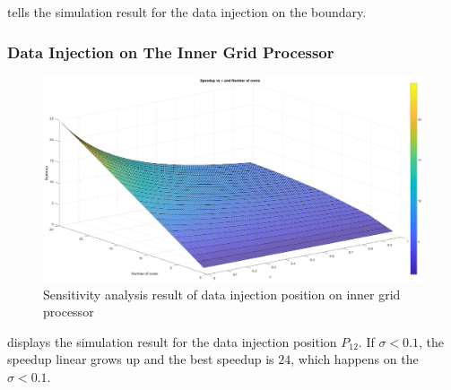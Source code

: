  tells the simulation result for the data injection on the boundary.  

\newpage 
\subsubsection{Data Injection on The Inner Grid Processor}
\begin{figure}[!ht]
\centering
\includegraphics[width=1\columnwidth]{figure/sa5t5i_no.eps}
\caption{Sensitivity analysis result of data injection position on inner grid processor}
\label{fig:sa5t5i_no}
\end{figure}

 displays the simulation result for the data injection position $P_{12}$.   If $\sigma < 0.1$, the speedup linear grows up and the best speedup is $24$, which happens on the $\sigma < 0.1$.   